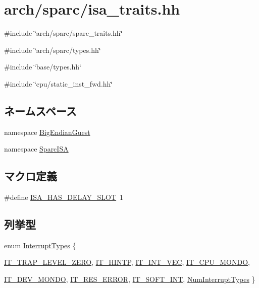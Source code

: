 \hypertarget{sparc_2isa__traits_8hh}{
\section{arch/sparc/isa\_\-traits.hh}
\label{sparc_2isa__traits_8hh}
}
{\ttfamily \#include \char`\"{}arch/sparc/sparc\_\-traits.hh\char`\"{}}\par
{\ttfamily \#include \char`\"{}arch/sparc/types.hh\char`\"{}}\par
{\ttfamily \#include \char`\"{}base/types.hh\char`\"{}}\par
{\ttfamily \#include \char`\"{}cpu/static\_\-inst\_\-fwd.hh\char`\"{}}\par
\subsection*{ネームスペース}
\begin{DoxyCompactItemize}
\item 
namespace \hyperlink{namespaceBigEndianGuest}{BigEndianGuest}
\item 
namespace \hyperlink{namespaceSparcISA}{SparcISA}
\end{DoxyCompactItemize}
\subsection*{マクロ定義}
\begin{DoxyCompactItemize}
\item 
\#define \hyperlink{sparc_2isa__traits_8hh_aae21ac6833454e7ead9810c372658afc}{ISA\_\-HAS\_\-DELAY\_\-SLOT}~1
\end{DoxyCompactItemize}
\subsection*{列挙型}
\begin{DoxyCompactItemize}
\item 
enum \hyperlink{namespaceSparcISA_acdad6d81b9a94402ce3979d531ae4f40}{InterruptTypes} \{ \par
\hyperlink{namespaceSparcISA_acdad6d81b9a94402ce3979d531ae4f40a990facc9547cd65bb78a7b1dd3141a47}{IT\_\-TRAP\_\-LEVEL\_\-ZERO}, 
\hyperlink{namespaceSparcISA_acdad6d81b9a94402ce3979d531ae4f40a4f80311c3981b4bb9a2fe0754cde660c}{IT\_\-HINTP}, 
\hyperlink{namespaceSparcISA_acdad6d81b9a94402ce3979d531ae4f40a0807b145d67d73e999f80760688319f6}{IT\_\-INT\_\-VEC}, 
\hyperlink{namespaceSparcISA_acdad6d81b9a94402ce3979d531ae4f40ab235dac7d6f199a238be0404d711b157}{IT\_\-CPU\_\-MONDO}, 
\par
\hyperlink{namespaceSparcISA_acdad6d81b9a94402ce3979d531ae4f40ae9f79440d594cb7eeac7d823720a62c8}{IT\_\-DEV\_\-MONDO}, 
\hyperlink{namespaceSparcISA_acdad6d81b9a94402ce3979d531ae4f40a39403fc273d5b050460c6a0f03a8e1e7}{IT\_\-RES\_\-ERROR}, 
\hyperlink{namespaceSparcISA_acdad6d81b9a94402ce3979d531ae4f40a8894b9db1ea658e61aabcfc0a8d50616}{IT\_\-SOFT\_\-INT}, 
\hyperlink{namespaceSparcISA_acdad6d81b9a94402ce3979d531ae4f40a2c6432ad9b7436e1bf24e9e795c49d50}{NumInterruptTypes}
 \}
\end{DoxyCompactItemize}
